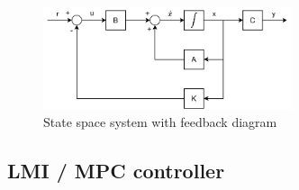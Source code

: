 \begin{figure}[h!]
	\centering
	\includegraphics[width=0.65\textwidth]{Graphics/State_space_feedback.pdf}
	\caption{State space system with feedback diagram}
	\label{fig:state_space_fb}
\end{figure}






\subsection{LMI / MPC controller}